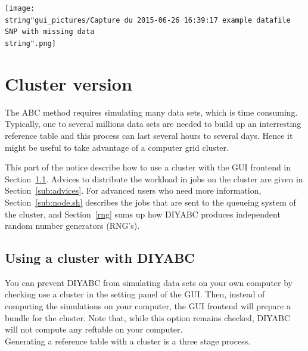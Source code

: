 \texttt{[image: \\string"gui\_pictures/Capture du 2015-06-26 16:39:17 example datafile SNP with missing data\\string".png]}

\clearpage{}


\section{Cluster version}

\label{cluster} The ABC method requires simulating many data sets,
which is time consuming. Typically, one to several millions data sets
are needed to build up an interresting reference table and this process
can last several hours to several days. Hence it might be useful to
take advantage of a computer grid cluster.

This part of the notice describe how to use a cluster with the GUI
frontend in Section~\ref{sub:proceed}. Advices to distribute the
workload in jobs on the cluster are given in Section~\ref{sub:advices}.
For advanced users who need more information, Section~\ref{sub:node.sh}
describes the jobs that are sent to the queueing system of the cluster,
and Section~\ref{rng} sums up how DIYABC produces independent random
number generators (RNG's).


\subsection{Using a cluster with DIYABC}

\label{sub:proceed} You can prevent DIYABC from simulating data sets
on your own computer by checking \textsf{use a cluster} in the setting
panel of the GUI. Then, instead of computing the simulations on your
computer, the GUI frontend will prepare a bundle for the cluster.
Note that, while this option remains checked, DIYABC will not compute
any reftable on your computer. \\
 Generating a reference table with a cluster is a three stage process.

